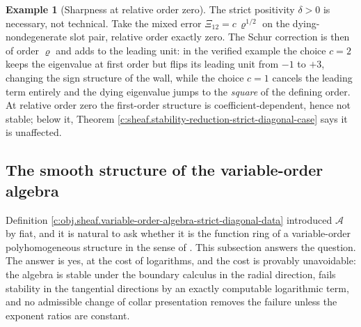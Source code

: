 \documentclass[11pt]{article}
\theoremstyle{definition}
\newtheorem{example}[theorem]{Example}
\theoremstyle{plain}
\begin{document}
\begin{example}[Sharpness at relative order zero]\label{c:note.sheaf.sharpness-relative-order-zero}
The strict positivity $\delta > 0$ is necessary, not technical. Take the mixed error $\Xi_{12} = c\,\varrho^{1/2}$ on the dying-nondegenerate slot pair, relative order exactly zero. The Schur correction is then of order $\varrho$ and adds to the leading unit: in the verified example the choice $c = 2$ keeps the eigenvalue at first order but flips its leading unit from $-1$ to $+3$, changing the sign structure of the wall, while the choice $c = 1$ cancels the leading term entirely and the dying eigenvalue jumps to the \emph{square} of the defining order. At relative order zero the first-order structure is coefficient-dependent, hence not stable; below it, Theorem \ref{c:sheaf.stability-reduction-strict-diagonal-case} says it is unaffected.
\end{example}

\subsection*{The smooth structure of the variable-order algebra}
\label{c:note.sheaf.setting-smooth-structure-variable-order-algebra}
Definition \ref{c:obj.sheaf.variable-order-algebra-strict-diagonal-data} introduced $\mathcal{A}$ by fiat, and it is natural to ask whether it is the function ring of a variable-order polyhomogeneous structure in the sense of \cite{Melrose1993}. This subsection answers the question. The answer is yes, at the cost of logarithms, and the cost is provably unavoidable: the algebra is stable under the boundary calculus in the radial direction, fails stability in the tangential directions by an exactly computable logarithmic term, and no admissible change of collar presentation removes the failure unless the exponent ratios are constant.
\end{document}
